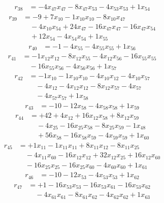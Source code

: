 \[\begin{aligned}
r_{38} &= - 4 x_{47} x_{47} - 8 x_{47} x_{53} - 4 x_{53} x_{53} + 1 x_{54}
\end{aligned}\]
\[\begin{aligned}
r_{39} &= - 9 + 7 x_{10} - 1 x_{10} x_{10} - 8 x_{10} x_{47} \\
 &\quad - 4 x_{10} x_{54} + 24 x_{47} - 16 x_{47} x_{47} - 16 x_{47} x_{54} \\
 &\quad + 12 x_{54} - 4 x_{54} x_{54} + 1 x_{55}
\end{aligned}\]
\[\begin{aligned}
r_{40} &= - 1 - 4 x_{55} - 4 x_{55} x_{55} + 1 x_{56}
\end{aligned}\]
\[\begin{aligned}
r_{41} &= - 1 x_{12} x_{12} - 8 x_{12} x_{55} - 4 x_{12} x_{56} - 16 x_{55} x_{55} \\
 &\quad - 16 x_{55} x_{56} - 4 x_{56} x_{56} + 1 x_{57}
\end{aligned}\]
\[\begin{aligned}
r_{42} &= - 1 x_{10} - 1 x_{10} x_{10} - 4 x_{10} x_{12} - 4 x_{10} x_{57} \\
 &\quad - 4 x_{12} - 4 x_{12} x_{12} - 8 x_{12} x_{57} - 4 x_{57} \\
 &\quad - 4 x_{57} x_{57} + 1 x_{58}
\end{aligned}\]
\[\begin{aligned}
r_{43} &= - 10 - 12 x_{58} - 4 x_{58} x_{58} + 1 x_{59}
\end{aligned}\]
\[\begin{aligned}
r_{44} &= + 42 + 4 x_{12} + 16 x_{12} x_{58} + 8 x_{12} x_{59} \\
 &\quad - 4 x_{25} - 16 x_{25} x_{58} - 8 x_{25} x_{59} - 1 x_{48} \\
 &\quad + 56 x_{58} - 16 x_{58} x_{59} - 4 x_{59} x_{59} + 1 x_{60}
\end{aligned}\]
\[\begin{aligned}
r_{45} &= + 1 x_{11} - 1 x_{11} x_{11} + 8 x_{11} x_{12} - 8 x_{11} x_{25} \\
 &\quad - 4 x_{11} x_{60} - 16 x_{12} x_{12} + 32 x_{12} x_{25} + 16 x_{12} x_{60} \\
 &\quad - 16 x_{25} x_{25} - 16 x_{25} x_{60} - 4 x_{60} x_{60} + 1 x_{61}
\end{aligned}\]
\[\begin{aligned}
r_{46} &= - 10 - 12 x_{53} - 4 x_{53} x_{53} + 1 x_{62}
\end{aligned}\]
\[\begin{aligned}
r_{47} &= + 1 - 16 x_{53} x_{53} - 16 x_{53} x_{61} - 16 x_{53} x_{62} \\
 &\quad - 4 x_{61} x_{61} - 8 x_{61} x_{62} - 4 x_{62} x_{62} + 1 x_{63}
\end{aligned}\]
